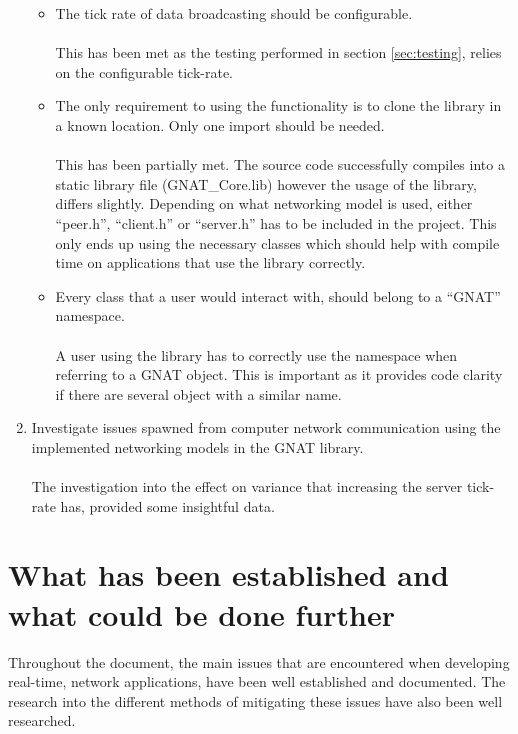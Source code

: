 \begin{enumerate}
\begin{itemize}
  \item The tick rate of data broadcasting should be configurable.
    \\\\
    This has been met as the testing performed in section \ref{sec:testing}, relies on the configurable tick-rate.


  \item The only requirement to using the functionality is to clone the library in a known location. Only one import should be needed.
    \\\\
    This has been partially met. The source code successfully compiles into a static library file (GNAT\_Core.lib) however the usage of the library, differs slightly. Depending on what networking model is used, either ``peer.h'', ``client.h'' or ``server.h'' has to be included in the project. This only ends up using the necessary classes which should help with compile time on applications that use the library correctly.


  \item Every class that a user would interact with, should belong to a ``GNAT'' namespace.
    \\\\
    A user using the library has to correctly use the namespace when referring to a GNAT object. This is important as it provides code clarity if there are several object with a similar name.
\end{itemize}


\item Investigate issues spawned from computer network communication using the implemented networking models in the GNAT library.
  \\\\
  The investigation into the effect on variance that increasing the server tick-rate has, provided some insightful data.
\end{enumerate}


\section{What has been established and what could be done further}
Throughout the document, the main issues that are encountered when developing real-time, network applications, have been well established and documented. The research into the different methods of mitigating these issues have also been well researched.

